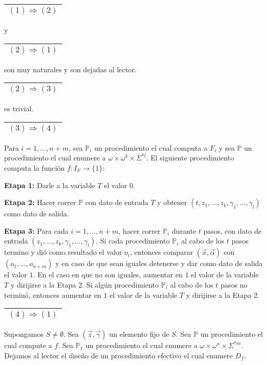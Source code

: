   \PROOF \begin{tabular}{|c|}\hline $(1) \Rightarrow (2)$\\\hline\end{tabular} y
    \begin{tabular}{|c|}\hline $(2) \Rightarrow (1)$\\\hline\end{tabular} son muy naturales y son dejadas al lector.

    \vspace{3mm}
    \begin{tabular}{|c|}\hline $(2) \Rightarrow (3)$\\\hline\end{tabular} es trivial.

    \vspace{3mm}
    \begin{tabular}{|c|}\hline $(3) \Rightarrow (4)$\\\hline\end{tabular} Para $i = 1, ..., n + m$, sea
    $\mathbb{P}_{i}$ un procedimiento el cual computa a $F_{i}$ y sea $\mathbb{P}$ un procedimiento el cual enumere a
    $\omega \times \omega^{k} \times \Sigma^{\ast l}$. El siguiente procedimiento computa la función
    $f:I_{F} \rightarrow \{1\}$:

    \vspace{3mm}
    \textbf{Etapa 1:}
    Darle a la variable $T$ el valor $0$.

    \textbf{Etapa 2:}
    Hacer correr $\mathbb{P}$ con dato de entrada $T$ y obtener $ (t, z_{1}, ..., z_{k}, \gamma_{1}, ..., \gamma_{l})$
    como dato de salida.

    \textbf{Etapa 3:}
    Para cada $i = 1, ..., n + m$, hacer correr $\mathbb{P}_{i}$ durante $t$ pasos, con dato de entrada $(z_{1}, ...,
    z_{k}, \gamma_{1}, ..., \gamma_{l})$. Si cada procedimiento $\mathbb{P}_{i}$ al cabo de los $t$ pasos termino y dió
    como resultado el valor $o_{i}$, entonces comparar $(\vec{x}, \vec{\alpha})$ con $(o_{1}, ..., o_{n+m})$ y en caso
    de que sean iguales detenerse y dar como dato de salida el valor $1$. En el caso en que no son iguales, aumentar en
    $1$ el valor de la variable $T$ y dirijirse a la Etapa 2. Si algún procedimiento $\mathbb{P}_{i}$ al cabo de los
    $t$ pasos no terminó, entonces aumentar en $1$ el valor de la variable $T$ y dirijirse a la Etapa 2.

    \vspace{3mm}
    \begin{tabular}{|c|}\hline $(4) \Rightarrow (1)$\\\hline\end{tabular} Supongamos $S \neq \emptyset$. Sea
      $(\vec{z}, \vec{\gamma})$ un elemento fijo de $S$. Sea $\mathbb{P}$ un procedimiento el cual compute a $f$. Sea
      $\mathbb{P}_{1}$ un procedimiento el cual enumere a $\omega \times \omega^{n}\times \Sigma^{\ast m}.$ Dejamos al
      lector el diseño de un procedimiento efectivo el cual enumere $D_{f}$.

  \QED
